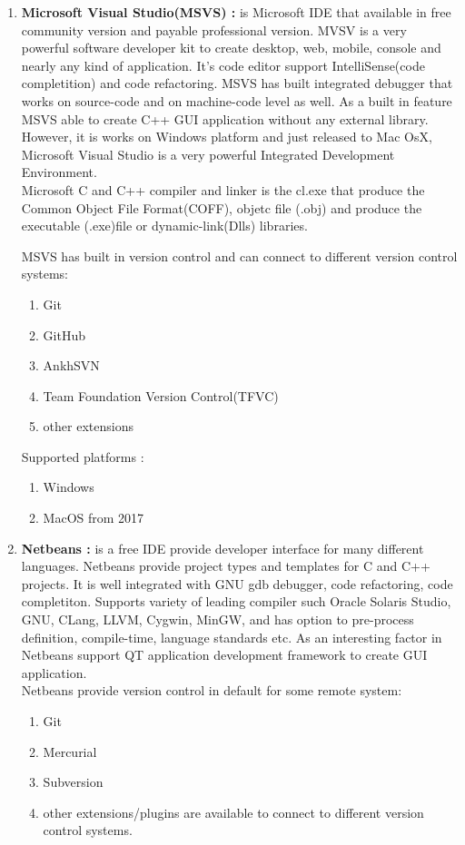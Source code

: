 \documentclass[12pt]{article}
\begin{document}
{\begin{enumerate}
\item \textbf{Microsoft Visual Studio(MSVS) : } is Microsoft IDE that available in free community version and payable professional version. MVSV is a very powerful software developer kit to create desktop, web, mobile, console and nearly any kind of application. It's code editor support IntelliSense(code completition) and code refactoring. MSVS has built integrated debugger that works on source-code and on machine-code level as well. As a built in feature MSVS able to create C++ GUI application without any external library. However, it is works on Windows platform and just released to Mac OsX, Microsoft Visual Studio is a very powerful Integrated Development Environment.\cite{VS}\\

Microsoft C and C++ compiler and linker is the cl.exe that produce the Common Object File Format(COFF), objetc file (.obj) and produce the executable (.exe)file or dynamic-link(Dlls) libraries. 

MSVS has built in version control and can connect to different version control systems:
\begin{enumerate}
\item Git
\item GitHub
\item AnkhSVN
\item Team Foundation Version Control(TFVC)
\item other extensions
\end{enumerate} 

Supported platforms : 
\begin{enumerate}
\item Windows
\item MacOS from 2017
\end{enumerate}

\item \textbf{Netbeans : } is a free IDE provide developer interface for many different languages. Netbeans provide project types and templates for C and C++ projects. It is well integrated with GNU gdb debugger, code refactoring, code completiton. Supports variety of leading compiler such Oracle Solaris Studio, GNU, CLang, LLVM, Cygwin, MinGW, and has option to pre-process definition, compile-time, language standards etc. As an interesting factor in Netbeans support QT application development framework to create GUI application.\cite{Netbeans}\\

Netbeans provide version control in default for some remote system:
\begin{enumerate}
\item Git
\item Mercurial
\item Subversion
\item other extensions/plugins are available to connect to different version control systems.
\end{enumerate} 


\end{enumerate}}
\end{document}
